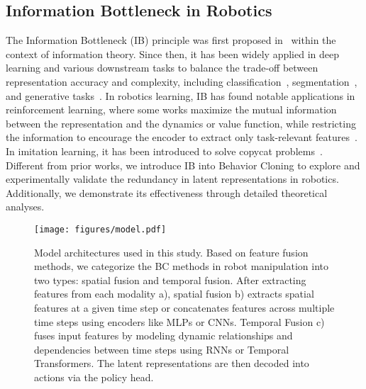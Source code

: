\subsection{Information Bottleneck in Robotics}
The Information Bottleneck (IB) principle was first proposed in~\cite{tishby2000information} within the context of information theory. 
Since then, it has been widely applied in deep learning and various downstream tasks to balance the trade-off between representation accuracy and complexity, including classification~\cite{federici2019learning}, segmentation~\cite{bardera2009image, lee2021reducing}, and generative tasks~\cite{jeon2021ib}.
In robotics learning, IB has found notable applications in reinforcement learning, where some works maximize the mutual information between the representation and the dynamics or value function, while restricting the information to encourage the encoder to extract only task-relevant features~\cite{kim2019curiosity, bai2021dynamic, he2024bridging}. In imitation learning, it has been introduced to solve copycat problems~\cite {wen2020fighting}.
Different from prior works, we introduce IB into Behavior Cloning to explore and experimentally validate the redundancy in latent representations in robotics. 
Additionally, we demonstrate its effectiveness through detailed theoretical analyses.



\begin{figure*}[ht]
\begin{center}
\centerline{\texttt{[image: figures/model.pdf]}}
\caption{
Model architectures used in this study. Based on feature fusion methods, we categorize the BC methods in robot manipulation into two types: spatial fusion and temporal fusion. 
After extracting features from each modality a), spatial fusion b) extracts spatial features at a given time step or concatenates features across multiple time steps using encoders like MLPs or CNNs. Temporal Fusion c) fuses input features by modeling dynamic relationships and dependencies between time steps using RNNs or Temporal Transformers. 
The latent representations are then decoded into actions via the policy head.
}
\label{fig:model}
\end{center}
\vskip -0.25in
\end{figure*}



